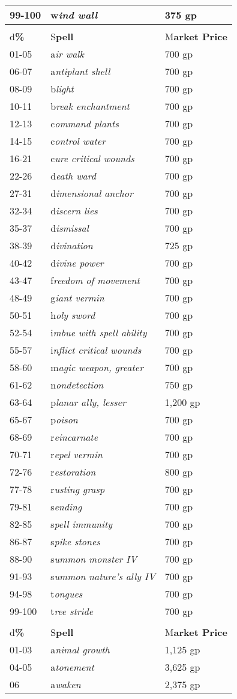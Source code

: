 \documentclass{article}
\begin{document}
\begin{tabular}{|>{\raggedright}p{29pt}|>{\raggedright}p{138pt}|>{\raggedright}p{147pt}|}
\hline
99-100 & w\textit{ind wall} & 375 gp\tabularnewline
\hline
\multicolumn{3}{|p{314pt}|}{4\textit{\textbf{th-Level Divine Spells}}}\tabularnewline
\hline
d\textbf{\%} & S\textbf{pell} & M\textbf{arket Price}\tabularnewline
\hline
01-05 & a\textit{ir walk} & 700 gp\tabularnewline
\hline
06-07 & a\textit{ntiplant shell} & 700 gp\tabularnewline
\hline
08-09 & b\textit{light} & 700 gp\tabularnewline
\hline
10-11 & b\textit{reak enchantment} & 700 gp\tabularnewline
\hline
12-13 & c\textit{ommand plants} & 700 gp\tabularnewline
\hline
14-15 & c\textit{ontrol water} & 700 gp\tabularnewline
\hline
16-21 & c\textit{ure critical wounds} & 700 gp\tabularnewline
\hline
22-26 & d\textit{eath ward} & 700 gp\tabularnewline
\hline
27-31 & d\textit{imensional anchor} & 700 gp\tabularnewline
\hline
32-34 & d\textit{iscern lies} & 700 gp\tabularnewline
\hline
35-37 & d\textit{ismissal} & 700 gp\tabularnewline
\hline
38-39 & d\textit{ivination} & 725 gp\tabularnewline
\hline
40-42 & d\textit{ivine power} & 700 gp\tabularnewline
\hline
43-47 & f\textit{reedom of movement} & 700 gp\tabularnewline
\hline
48-49 & g\textit{iant vermin} & 700 gp\tabularnewline
\hline
50-51 & h\textit{oly sword} & 700 gp\tabularnewline
\hline
52-54 & i\textit{mbue with spell ability} & 700 gp\tabularnewline
\hline
55-57 & i\textit{nflict critical wounds} & 700 gp\tabularnewline
\hline
58-60 & m\textit{agic weapon, greater} & 700 gp\tabularnewline
\hline
61-62 & n\textit{ondetection} & 750 gp\tabularnewline
\hline
63-64 & p\textit{lanar ally, lesser} & 1,200 gp\tabularnewline
\hline
65-67 & p\textit{oison} & 700 gp\tabularnewline
\hline
68-69 & r\textit{eincarnate} & 700 gp\tabularnewline
\hline
70-71 & r\textit{epel vermin} & 700 gp\tabularnewline
\hline
72-76 & r\textit{estoration} & 800 gp\tabularnewline
\hline
77-78 & r\textit{usting grasp} & 700 gp\tabularnewline
\hline
79-81 & s\textit{ending} & 700 gp\tabularnewline
\hline
82-85 & s\textit{pell immunity} & 700 gp\tabularnewline
\hline
86-87 & s\textit{pike stones} & 700 gp\tabularnewline
\hline
88-90 & s\textit{ummon monster IV} & 700 gp\tabularnewline
\hline
91-93 & s\textit{ummon nature's ally IV} & 700 gp\tabularnewline
\hline
94-98 & t\textit{ongues} & 700 gp\tabularnewline
\hline
99-100 & t\textit{ree stride} & 700 gp\tabularnewline
\hline
\multicolumn{3}{|p{314pt}|}{5\textit{\textbf{th-Level Divine Spells}}}\tabularnewline
\hline
d\textbf{\%} & S\textbf{pell} & M\textbf{arket Price}\tabularnewline
\hline
01-03 & a\textit{nimal growth} & 1,125 gp\tabularnewline
\hline
04-05 & a\textit{tonement} & 3,625 gp\tabularnewline
\hline
06 & a\textit{waken} & 2,375 gp\tabularnewline

\end{tabular}
\end{document}
